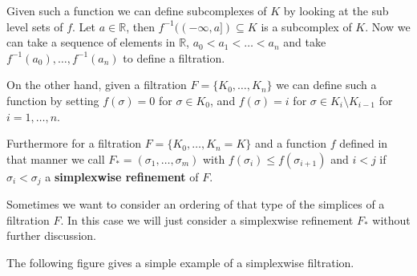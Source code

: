 Given such a function we can define subcomplexes of $K$ by looking at the sub level sets of $f$. Let $a \in \mathbb{R}$, then $f^{-1}((-\infty,a]) \subseteq K$ is a subcomplex of $K$. Now we can take a sequence of elements in $\mathbb{R}$, $a_0 < a_1 < \dots < a_n$ and take $f^{-1}(a_0), \dots, f^{-1}(a_n)$ to define a filtration. 

On the other hand, given a filtration $F = \{K_0, \dots, K_n\}$ we can define such a function by setting $f(\sigma) = 0$ for $\sigma \in K_0$, and $f(\sigma) = i$ for $\sigma \in K_i \setminus K_{i-1}$ for $i = 1, \dots, n$.

Furthermore for a filtration $F = \{K_0, \dots, K_n = K\}$ and a function $f$ defined in that manner we call $F_* = (\sigma_1,\dots,\sigma_m)$ with $f(\sigma_i) \leq f(\sigma_{i+1})$ and $i < j$ if $\sigma_i < \sigma_j$ a \textbf{simplexwise refinement} of $F$. 
 
Sometimes we want to consider an ordering of that type of the simplices of a filtration $F$. In this case we will just consider a simplexwise refinement $F_*$ without further discussion. 

The following figure gives a simple example of a simplexwise filtration.  

